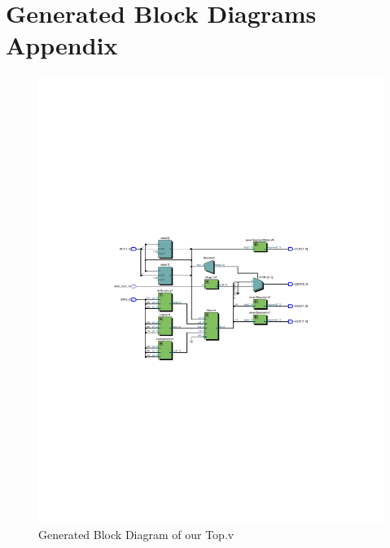 \documentclass[11pt]{article}
\begin{document}
\section{Generated Block Diagrams Appendix}
\begin{figure}[H]
    \centering
        \includegraphics[clip, trim=3cm 10cm 3cm 10cm, width=\textwidth]{Top}
        \caption{Generated Block Diagram of our Top.v}
\end{figure}
\end{document}
